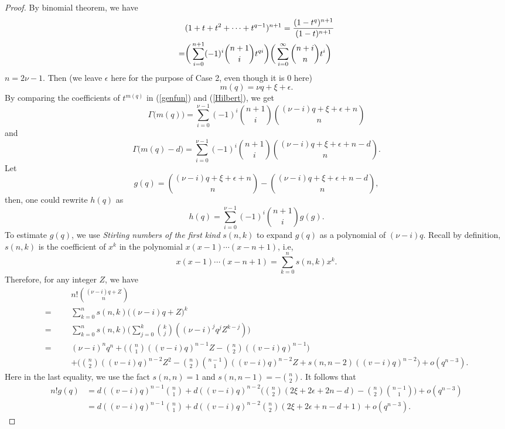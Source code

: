 \documentclass[draft]{amsart}
\theoremstyle{definition}
\numberwithin{equation}{theorem}
\begin{document}
\begin{proof}
By binomial theorem, we have
\begin{align}
&(1+t+t^2+\cdots+t^{q-1})^{n+1}
=\dfrac{(1-t^q)^{n+1}}{(1-t)^{n+1}} \notag\\
=&\bigg(\sum_{i=0}^{n+1}(-1)^i{{n+1} \choose i}t^{qi}\bigg) \bigg(\sum_{i=0}^{\infty}{{n+i} \choose n}t^i \bigg )\label{Hilbert} 
\end{align}
   $n=2\nu-1$. 
Then (we leave $\epsilon$ here for the purpose of Case 2, even though it is 0 here)
\[m(q)=\nu q +\xi+\epsilon.\]
By comparing the coefficients of $t^{m(q)}$ in (\ref{genfun}) and (\ref{Hilbert}), we get
\begin{equation}
{{\Gamma}} \bigg(m(q) \bigg)=\sum_{i=0}^{\nu-1}(-1)^i
{{n+1} \choose i}
{{(\nu-i)q+\xi+\epsilon+n} \choose n}
\end{equation}
and
\begin{equation}
{{\Gamma}} \bigg(m(q)-d \bigg)=\sum_{i=0}^{\nu-1}(-1)^i
{{n+1} \choose i}
{{(\nu-i)q+\xi+\epsilon+n-d} \choose n}.
\end{equation}
Let
\begin{equation}\label{GQ}
g(q)={{(\nu-i)q+\xi+\epsilon+n} \choose n}-{{(\nu-i)q+\xi+\epsilon+n-d} \choose n},
\end{equation}
then, one could rewrite $h(q)$ as
\begin{equation}
h(q)=\sum_{i=0}^{\nu-1}(-1)^i
{{n+1} \choose i}
g(g).
\end{equation}
To estimate $g(q)$, we use \textit{Stirling numbers of the first kind} $s(n,k)$ to expand $g(q)$ as a polynomial of $(\nu-i)q$. Recall  by definition,  $s(n,k)$ is the coefficient of 
$x^k$ in the polynomial $x(x-1)\cdots (x-n+1)$, i.e,
\begin{equation}\label{Stirling}
x(x-1)\cdots (x-n+1)=\sum_{k=0}^n s(n,k)x^k.
\end{equation}
Therefore, for any integer $Z$, we have
\begin{align*}
&n!{(\nu-i)q+Z \choose n}\\
=&\sum_{k=0}^n s(n,k)\bigg ((\nu-i)q+Z\bigg)^k\\
=&\sum_{k=0}^n s(n,k)\bigg (\sum_{j=0}^k{k \choose j}((\nu-i)^jq^jZ^{k-j})\bigg )\\
=&(\nu-i)^nq^n+\bigg( {n \choose 1}((v-i)q)^{n-1}Z-{n \choose 2}((v-i)q)^{n-1} \bigg)\\
\hspace{1cm}&+\bigg({n \choose 2} ((v-i)q)^{n-2}Z^2 -{n \choose 2}{n-1 \choose 1}((v-i)q)^{n-2}Z +s(n,n-2)((v-i)q)^{n-2} \bigg)+o(q^{n-3}).
\end{align*}
Here in the last equality, we use the fact $s(n,n)=1$ and $s(n,n-1)=-{n \choose 2}$.
It follows that
\begin{align*}
n!g(q)&=d((v-i)q)^{n-1}{n \choose 1}+d((v-i)q)^{n-2}\bigg({n \choose 2}  (2\xi+2\epsilon+2n-d)-{n \choose 2}{n-1 \choose 1} \bigg)+o(q^{n-3})\\
&=d((v-i)q)^{n-1}{n \choose 1}+d((v-i)q)^{n-2}{n \choose 2}  (2\xi+2\epsilon+n-d+1)+o(q^{n-3}).
\end{align*}
 

\end{proof}
\end{document}
